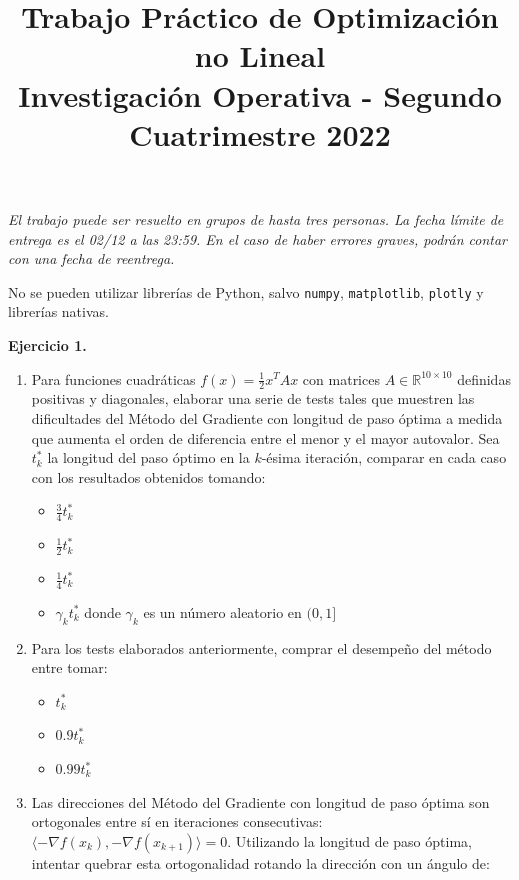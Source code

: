 \documentclass{article}
\title{Trabajo Práctico de Optimización no Lineal \\
\large Investigación Operativa - Segundo Cuatrimestre 2022}
\author{}
\date{}
\begin{document}
\maketitle

\textit{El trabajo puede ser resuelto en grupos de hasta tres personas. La fecha límite de entrega es el 02/12 a las 23:59. En el caso de haber errores graves, podrán contar con una fecha de reentrega.}

\vspace*{\baselineskip}

No se pueden utilizar librerías de Python, salvo \verb|numpy|, \verb|matplotlib|, \verb|plotly| y librerías nativas.

\vspace*{\baselineskip}

\textbf{Ejercicio 1.}
\begin{enumerate}
    \item Para funciones cuadráticas $f(x) = \frac{1}{2}x^T A x$ con matrices $A\in\mathbb{R}^{10\times 10}$ definidas positivas y diagonales, elaborar una serie de tests tales que muestren las dificultades del Método del Gradiente con longitud de paso óptima a medida que aumenta el orden de diferencia entre el menor y el mayor autovalor. Sea $t_k^*$ la longitud del paso óptimo en la $k$-ésima iteración, comparar en cada caso con los resultados obtenidos tomando:
    \begin{itemize}
        \item $\frac{3}{4}t_k^*$
        \item $\frac{1}{2}t_k^*$
        \item $\frac{1}{4}t_k^*$
        \item $\gamma_k t_k^*$ donde $\gamma_k$ es un número aleatorio en $(0,1]$
    \end{itemize}
    \item Para los tests elaborados anteriormente, comprar el desempeño del método entre tomar:
    \begin{itemize}
        \item $t_k^*$
        \item $0.9t_k^*$
        \item $0.99t_k^*$
    \end{itemize}
    \item Las direcciones del Método del Gradiente con longitud de paso óptima son ortogonales entre sí en iteraciones consecutivas: $\langle -\nabla f(x_k), -\nabla f(x_{k+1})\rangle = 0$. Utilizando la longitud de paso óptima, intentar quebrar esta ortogonalidad rotando la dirección con un ángulo de:

\end{enumerate}
\end{document}
